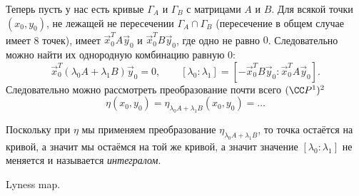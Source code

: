 \documentclass[12pt,a4paper]{article}
\begin{document}
    \begin{definition}
        Теперь пусть у нас есть кривые $\Gamma_A$ и $\Gamma_B$ с матрицами $A$ и $B$. Для всякой точки $(x_0, y_0)$, не лежащей не пересечении $\Gamma_A \cap \Gamma_B$ (пересечение в общем случае имеет 8 точек), имеет $\vec{x}_0^T A \vec{y}_0$ и $\vec{x}_0^T B \vec{y}_0$, где одно не равно $0$. Следовательно можно найти их однородную комбинацию равную $0$:
        \[\vec{x}_0^T (\lambda_0 A + \lambda_1 B) \vec{y}_0 = 0, \qquad [\lambda_0: \lambda_1] = [- \vec{x}_0^T B \vec{y}_0: \vec{x}_0^T A \vec{y}_0].\]
        Следовательно можно рассмотреть преобразование почти всего $(\CC P^1)^2$
        \[
            \eta(x_0, y_0)
            = \eta_{\lambda_0 A + \lambda_1 B}(x_0, y_0)
            = \dots
        \]
    \end{definition}

    \begin{remark}
        Поскольку при $\eta$ мы применяем преобразование $\eta_{\lambda_0 A + \lambda_1 B}$, то точка остаётся на кривой, а значит мы остаёмся на той же кривой, а значит значение $[\lambda_0: \lambda_1]$ не меняется и называется \emph{интегралом}.
    \end{remark}

    Lyness map.
\end{document}
